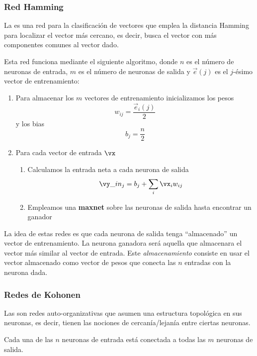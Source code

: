 \subsubsection{Red Hamming}
La  es una red para la clasificación de vectores que emplea la distancia Hamming para localizar el vector más cercano, es decir, busca el vector con más componentes comunes al vector dado.

Esta red funciona mediante el siguiente algoritmo, donde $n$ es el número de neuronas de entrada, $m$ es el número de neuronas de salida y $\vec{e}(j)$ es el $j$-ésimo vector de entrenamiento:
\begin{enumerate}
\item Para almacenar los $m$ vectores de entrenamiento inicializamos los pesos
\[w_{ij} = \frac{\vec{e}_i(j)}{2}\]
y los bias
\[b_j = \frac{n}{2}\]
\item Para cada vector de entrada $\vx$
\begin{enumerate}
\item Calculamos la entrada neta a cada neurona de salida
\[\vy\_in_j = b_j + \sum_i \vx_iw_{ij}\]
\item Empleamos una \textbf{maxnet} sobre las neuronas de salida hasta encontrar un ganador
\end{enumerate}
\end{enumerate}

\obs La idea de estas redes es que cada neurona de salida tenga ``almacenado'' un vector de entrenamiento. La neurona ganadora será aquella que almacenara el vector más similar al vector de entrada. Este \emph{almacenamiento} consiste en usar el vector almacenado como vector de pesos que conecta las $n$ entradas con la neurona dada.

\subsubsection{Redes de Kohonen}
Las  son redes auto-organizativas que asumen una estructura topológica en sus neuronas, es decir, tienen las nociones de cercanía/lejanía entre ciertas neuronas.

Cada una de las $n$ neuronas de entrada está conectada a todas las $m$ neuronas de salida.


